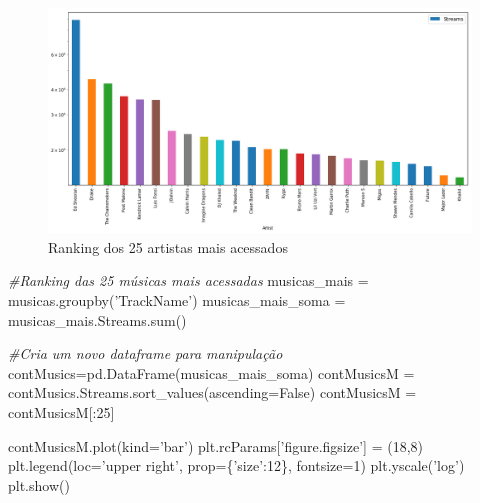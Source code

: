 \documentclass[11pt]{article}
\makeatletter
\def\maxwidth{\ifdim\Gin@nat@width>\linewidth\linewidth
    \else\Gin@nat@width\fi}
\let\Oldincludegraphics\includegraphics
\renewcommand{\includegraphics}[1]{\Oldincludegraphics[width=.8\maxwidth]{#1}}
\newenvironment{Shaded}{}{}
\newcommand{\DecValTok}[1]{\textcolor[rgb]{0.25,0.63,0.44}{{#1}}}
\newcommand{\StringTok}[1]{\textcolor[rgb]{0.25,0.44,0.63}{{#1}}}
\newcommand{\CommentTok}[1]{\textcolor[rgb]{0.38,0.63,0.69}{\textit{{#1}}}}
\newcommand{\NormalTok}[1]{{#1}}
\newcommand{\VariableTok}[1]{\textcolor[rgb]{0.10,0.09,0.49}{{#1}}}
\newcommand{\OperatorTok}[1]{\textcolor[rgb]{0.40,0.40,0.40}{{#1}}}
\newcommand{\BuiltInTok}[1]{{#1}}
\makeatother
\begin{document}
\begin{figure}
\centering
\includegraphics{output_9_0.png}
\caption{Ranking dos 25 artistas mais acessados}
\end{figure}

    \begin{Shaded}
\begin{Highlighting}[]

\CommentTok{#Ranking das 25 músicas mais acessadas}
\NormalTok{musicas_mais }\OperatorTok{=}\NormalTok{ musicas.groupby(}\StringTok{'TrackName'}\NormalTok{)}
\NormalTok{musicas_mais_soma }\OperatorTok{=}\NormalTok{ musicas_mais.Streams.}\BuiltInTok{sum}\NormalTok{()}

\CommentTok{#Cria um novo dataframe para manipulação}
\NormalTok{contMusics}\OperatorTok{=}\NormalTok{pd.DataFrame(musicas_mais_soma)}
\NormalTok{contMusicsM }\OperatorTok{=}\NormalTok{ contMusics.Streams.sort_values(ascending}\OperatorTok{=}\VariableTok{False}\NormalTok{)}
\NormalTok{contMusicsM }\OperatorTok{=}\NormalTok{ contMusicsM[:}\DecValTok{25}\NormalTok{]}

\NormalTok{contMusicsM.plot(kind}\OperatorTok{=}\StringTok{'bar'}\NormalTok{)}
\NormalTok{plt.rcParams[}\StringTok{'figure.figsize'}\NormalTok{] }\OperatorTok{=}\NormalTok{ (}\DecValTok{18}\NormalTok{,}\DecValTok{8}\NormalTok{)}
\NormalTok{plt.legend(loc}\OperatorTok{=}\StringTok{'upper right'}\NormalTok{, prop}\OperatorTok{=}\NormalTok{\{}\StringTok{'size'}\NormalTok{:}\DecValTok{12}\NormalTok{\}, fontsize}\OperatorTok{=}\DecValTok{1}\NormalTok{)}
\NormalTok{plt.yscale(}\StringTok{'log'}\NormalTok{)}
\NormalTok{plt.show()}
\end{Highlighting}
\end{Shaded}
\end{document}
